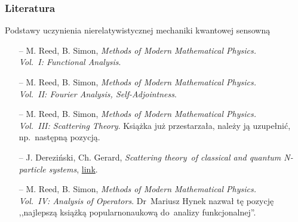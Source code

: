 \documentclass{beamer} \mode<presentation>
\newcommand{\colorlink}[1]{\href{#1}{\color{orange} link}}
\begin{document}
\begin{frame}
  \frametitle{Literatura}

  \begin{block}{Podstawy uczynienia nierelatywistycznej mechaniki
      kwantowej sensowną}
    \begin{itemize}
    \item[--] M. Reed, B. Simon, \emph{Methods of Modern Mathematical
        Physics. \\
        Vol.~I: Functional Analysis}.
    \item[--] M. Reed, B. Simon, \emph{Methods of Modern Mathematical
        Physics. \\
        Vol.~II: Fourier Analysis, Self-Adjointness}.
    \item[--] M. Reed, B. Simon, \emph{Methods of Modern Mathematical
        Physics. \\
        Vol.~III: Scattering Theory}. Książka już przestarzała, należy
      ją uzupełnić, np.~następną pozycją.
    \item[--] J. Dereziński, Ch. Gerard, \emph{Scattering theory~of
        classical and quantum N-particle systems},
      \colorlink{http://www.fuw.edu.pl/~derezins/}.
    \item[--] M. Reed, B. Simon, \emph{Methods of Modern Mathematical
        Physics. \\
        Vol.~IV: Analysis of Operators}. Dr~Mariusz Hynek nazwał tę
      pozycję ,,najlepszą książką popularnonaukową do~analizy
      funkcjonalnej''.
    \end{itemize}
  \end{block}

\end{frame}
\end{document}

